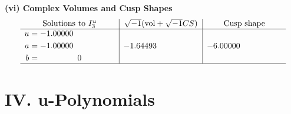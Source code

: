 \documentclass[1p]{elsarticle_modified}
\theoremstyle{definition}
\newcommand{\I}{\sqrt{-1}}
\begin{document}
\newpage\flushleft \textbf{(vi) Complex Volumes and Cusp Shapes}
$$\begin{array}{c|c|c}  
\text{Solutions to }I^u_{3}& \I (\text{vol} + \sqrt{-1}CS) & \text{Cusp shape}\\
 \hline 
\begin{aligned}
u &= -1.00000\phantom{ +0.000000I} \\
a &= -1.00000\phantom{ +0.000000I} \\
b &= \phantom{-0.000000 } 0\end{aligned}
 & -1.64493\phantom{ +0.000000I} & -6.00000\phantom{ +0.000000I}\\
 \hline 
 \end{array}$$\newpage
\newpage\renewcommand{\arraystretch}{1}
\centering \section*{ IV. u-Polynomials}
\end{document}
